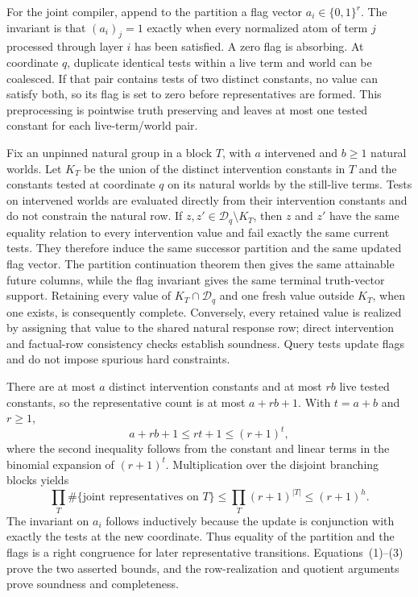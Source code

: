 For the joint compiler, append to the partition a flag vector \(a_i\in\{0,1\}^r\).  The invariant is that \((a_i)_j=1\) exactly when every normalized atom of term \(j\) processed through layer \(i\) has been satisfied.  A zero flag is absorbing.  At coordinate \(q\), duplicate identical tests within a live term and world can be coalesced.  If that pair contains tests of two distinct constants, no value can satisfy both, so its flag is set to zero before representatives are formed.  This preprocessing is pointwise truth preserving and leaves at most one tested constant for each live-term/world pair.

Fix an unpinned natural group in a block \(T\), with \(a\) intervened and \(b\geq1\) natural worlds.  Let \(K_T\) be the union of the distinct intervention constants in \(T\) and the constants tested at coordinate \(q\) on its natural worlds by the still-live terms.  Tests on intervened worlds are evaluated directly from their intervention constants and do not constrain the natural row.  If \(z,z'\in\mathcal D_q\setminus K_T\), then \(z\) and \(z'\) have the same equality relation to every intervention value and fail exactly the same current tests.  They therefore induce the same successor partition and the same updated flag vector.  The partition continuation theorem then gives the same attainable future columns, while the flag invariant gives the same terminal truth-vector support.  Retaining every value of \(K_T\cap\mathcal D_q\) and one fresh value outside \(K_T\), when one exists, is consequently complete.  Conversely, every retained value is realized by assigning that value to the shared natural response row; direct intervention and factual-row consistency checks establish soundness.  Query tests update flags and do not impose spurious hard constraints.

There are at most \(a\) distinct intervention constants and at most \(rb\) live tested constants, so the representative count is at most \(a+rb+1\).  With \(t=a+b\) and \(r\geq1\),
\[
 a+rb+1\leq rt+1\leq(r+1)^t,
\tag{2}
\]
where the second inequality follows from the constant and linear terms in the binomial expansion of \((r+1)^t\).  Multiplication over the disjoint branching blocks yields
\[
 \prod_T\#\{\text{joint representatives on }T\}
 \leq\prod_T(r+1)^{|T|}
 \leq(r+1)^h.
\tag{3}
\]
The invariant on \(a_i\) follows inductively because the update is conjunction with exactly the tests at the new coordinate.  Thus equality of the partition and the flags is a right congruence for later representative transitions.  Equations~(1)--(3) prove the two asserted bounds, and the row-realization and quotient arguments prove soundness and completeness.

